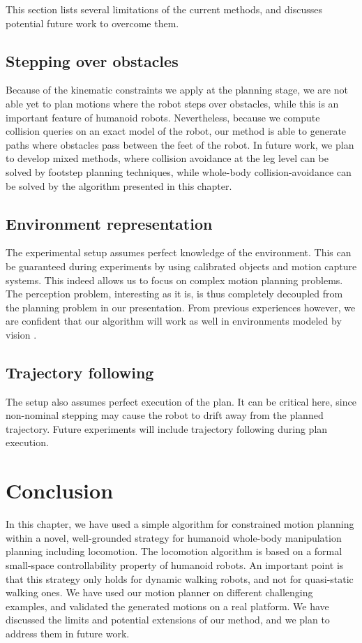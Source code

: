 This section lists several limitations of the current methods, and
discusses potential future work to overcome them.

\subsection{Stepping over obstacles}

Because of the kinematic constraints we apply at the planning stage,
we are not able yet to plan motions where the robot steps over
obstacles, while this is an important feature of humanoid
robots. Nevertheless, because we compute collision queries on an exact
model of the robot, our method is able to generate paths where
obstacles pass between the feet of the robot.  In future work, we plan
to develop mixed methods, where collision avoidance at the leg level
can be solved by footstep planning techniques, while whole-body
collision-avoidance can be solved by the algorithm presented in this
chapter.

\subsection{Environment representation}

The experimental setup assumes perfect knowledge of the
environment. This can be guaranteed during experiments by using
calibrated objects and motion capture systems. This indeed allows us
to focus on complex motion planning problems. The perception problem,
interesting as it is, is thus completely decoupled from the planning
problem in our presentation. From previous experiences however, we are
confident that our algorithm will work as well in environments modeled
by vision \cite{Nakhei4755945,DanLauLam2012}.

\subsection{Trajectory following}

The setup also assumes perfect execution of the plan. It can be
critical here, since non-nominal stepping may cause the robot to drift
away from the planned trajectory. Future experiments will include
trajectory following during plan execution.

\section{Conclusion}

In this chapter, we have used a simple algorithm for constrained
motion planning within a novel, well-grounded strategy for humanoid
whole-body manipulation planning including locomotion. The locomotion
algorithm is based on a formal small-space controllability property of
humanoid robots. An important point is that this strategy only holds
for dynamic walking robots, and not for quasi-static walking ones. We
have used our motion planner on different challenging examples, and
validated the generated motions on a real platform. We have discussed
the limits and potential extensions of our method, and we plan to
address them in future work.

